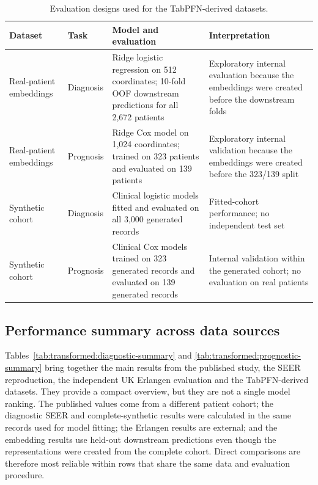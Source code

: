 \begin{table}[htbp]
\centering\small
\caption{Evaluation designs used for the TabPFN-derived datasets.}
\label{tab:transformed:contracts}
\begin{tabularx}{\linewidth}{@{}>{\RaggedRight\arraybackslash}p{2.0cm}
>{\RaggedRight\arraybackslash}p{1.45cm}YY@{}}
\toprule
Dataset & Task & Model and evaluation & Interpretation \\
\midrule
Real-patient embeddings & Diagnosis & Ridge logistic regression on 512
coordinates; 10-fold OOF downstream predictions for all 2,672 patients &
Exploratory internal evaluation because the embeddings were created before the
downstream folds \\
Real-patient embeddings & Prognosis & Ridge Cox model on 1,024 coordinates;
trained on 323 patients and evaluated on 139 patients & Exploratory internal
validation because the embeddings were created before the 323/139 split \\
Synthetic cohort & Diagnosis & Clinical logistic models fitted and evaluated on
all 3,000 generated records & Fitted-cohort performance; no independent test set \\
Synthetic cohort & Prognosis & Clinical Cox models trained on 323 generated
records and evaluated on 139 generated records & Internal validation within the
generated cohort; no evaluation on real patients \\
\bottomrule
\end{tabularx}
\end{table}
\FloatBarrier

\subsection{Performance summary across data sources}

Tables~\ref{tab:transformed:diagnostic-summary} and
\ref{tab:transformed:prognostic-summary} bring together the main results from
the published study, the SEER reproduction, the independent UK Erlangen
evaluation and the TabPFN-derived datasets. They provide a compact overview,
but they are not a single model ranking. The published values come from a
different patient cohort; the diagnostic SEER and complete-synthetic results
were calculated in the same records used for model fitting; the Erlangen
results are external; and the embedding results use held-out downstream
predictions even though the representations were created from the complete
cohort. Direct comparisons are therefore most reliable within rows that share
the same data and evaluation procedure.

